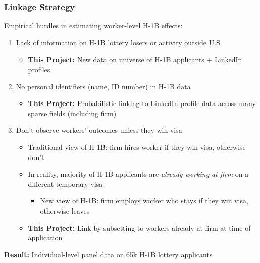 \documentclass[xcolor=dvipsnames, compress, 12pt, aspectratio=169, presentation]{beamer}
\begin{document}
\begin{frame}
    \frametitle{Linkage Strategy}
    Empirical hurdles in estimating worker-level H-1B effects:
    \vspace{2mm}
    \begin{enumerate}
        \item Lack of information on H-1B lottery losers or activity outside U.S. 
        \begin{itemize}
            \item \textbf{This Project:} New data on universe of H-1B applicants + LinkedIn profiles
        \end{itemize}
        \vspace{2mm}
        \item No personal identifiers (name, ID number) in H-1B data 
        \begin{itemize}
            \item \textbf{This Project:} Probabilistic linking to LinkedIn profile data across many sparse fields (including firm) 
        \end{itemize}
        \vspace{2mm}
        \item Don't observe workers' outcomes unless they win visa 
        \begin{itemize}
            \item Traditional view of H-1B: firm hires worker if they win visa, otherwise don't 
            \vspace{2mm}
            \item In reality, majority of H-1B applicants are \textit{already working at firm} on a different temporary visa
            \begin{itemize}
                \item New view of H-1B: firm employs worker who stays if they win visa, otherwise leaves 
            \end{itemize}
            \vspace{2mm}
            \item \textbf{This Project:} Link by subsetting to workers already at firm at time of application
        \end{itemize}
    \end{enumerate}
    \vspace{2mm}
    \textbf{Result:} Individual-level panel data on 65k H-1B lottery applicants
\end{frame}
\end{document}
